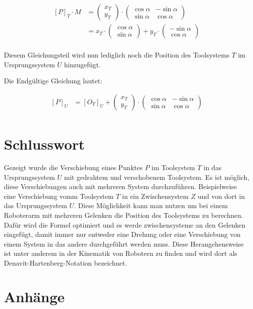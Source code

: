 \documentclass{article}
\newcommand{\m}[1]{\begin{pmatrix}#1\end{pmatrix}}
\begin{document}
    \[
        \begin{split}
            {[P]}_{T} \cdot M &= \m{x_T \\ y_T} \cdot \m{\cos \alpha & - \sin \alpha \\ \sin \alpha & \cos \alpha} \\
            &= x_T \cdot \m{\cos \alpha \\ \sin \alpha} + y_T \cdot \m{- \sin \alpha \\ \cos \alpha} \\
        \end{split}
    \]

    Diesem Gleichungsteil wird nun lediglich noch die Position des Toolsystems $T$ im Ursprungssystem $U$ hinzugefügt.

    Die Endgültige Gleichung lautet:

    \[
        \begin{split}
            {[P]}_U &= {[O_T]}_U + \m{x_T \\ y_T} \cdot \m{\cos \alpha & - \sin \alpha \\ \sin \alpha & \cos \alpha} \\
        \end{split}
    \]

    \newpage{}

    \section{Schlusswort}

    Gezeigt wurde die Verschiebung eines Punktes $P$ im Toolsystem $T$ in das Ursprungssystem $U$
    mit gedrahtem und verschobenem Toolsystem.
    Es ist möglich, diese Verschiebungen auch mit mehreren System durchzuführen. Beispielweise
    eine Verschiebung vomm Toolsystem $T$ in ein Zwischensystem $Z$ und von dort in das Ursprungssystem $U$.
    Diese Möglichkeit kann man nutzen um bei einem Roboterarm mit mehreren Gelenken die Position
    des Toolsystems zu berechnen. Dafür wird die Formel optimiert und es werde zwischensysteme an den Gelenken
    eingefügt, damit immer nur entweder eine Drehung oder eine Verschiebung von einem System in das andere
    durchgeführt werden muss. Diese Herangehensweise ist unter anderem in der Kinematik von Robotern
    zu finden und wird dort als Denavit-Hartenberg-Notation bezeichnet.
    


    \newpage

    \section{Anhänge}
\end{document}
